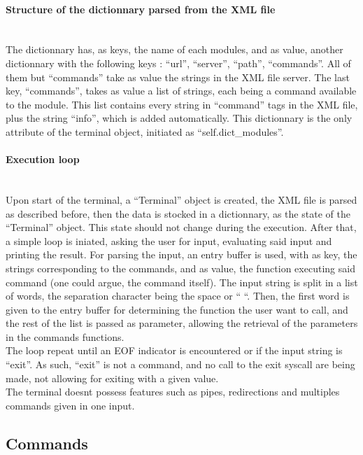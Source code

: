\paragraph{Structure of the dictionnary parsed from the XML file} \hspace{0pt} \\
The dictionnary has, as keys, the name of each modules, and as value, another dictionnary with the following keys : ``url'', ``server'', ``path'', ``commands''. All of them but ``commands'' take as value the strings in the XML file server. The last key, ``commands'', takes as value a list of strings, each being a command available to the module. This list contains every string in ``command'' tags in the XML file, plus the string ``info'', which is added automatically. This dictionnary is the only attribute of the terminal object, initiated as ``self.dict\_modules''.

\paragraph{Execution loop} \hspace{0pt} \\

Upon start of the terminal, a ``Terminal'' object is created, the XML file is parsed as described before, then the data is stocked in a dictionnary, as the state of the ``Terminal'' object. This state should not change during the execution. After that, a simple loop is iniated, asking the user for input, evaluating said input and printing the result. For parsing the input, an entry buffer is used, with as key, the strings corresponding to the commands, and as value, the function executing said command (one could argue, the command itself). The input string is split in a list of words, the separation character being the space or `` ``. Then, the first word is given to the entry buffer for determining the function the user want to call, and the rest of the list is passed as parameter, allowing the retrieval of the parameters in the commands functions. \\
The loop repeat until an EOF indicator is encountered or if the input string is ``exit''. As such, ``exit'' is not a command, and no call to the exit syscall are being made, not allowing for exiting with a given value. \\
The terminal doesnt possess features such as pipes, redirections and multiples commands given in one input.

\subsection{Commands}

